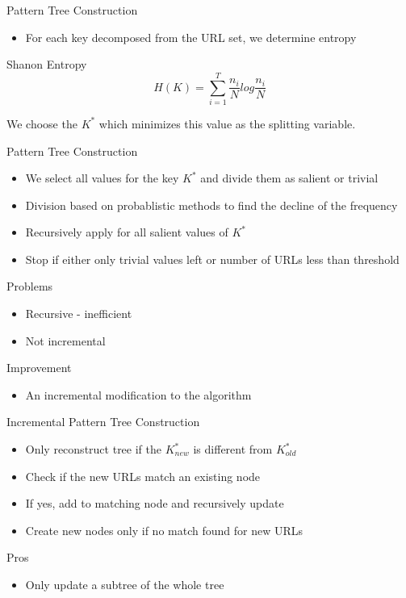 \documentclass[presentation]{beamer}
\begin{document}
\begin{frame}[label={sec:orgheadline14}]{Pattern Tree Construction}
\begin{itemize}
\item For each key decomposed from the URL set, we determine entropy
\end{itemize}

\alert{Shanon Entropy}
\begin{equation}
H(K) = \sum_{i=1}^{T} \frac{n_i}{N} log \frac{n_i}{N}
\end{equation}

We choose the \(K^*\) which minimizes this value as the splitting variable.
\end{frame}

\begin{frame}[label={sec:orgheadline15}]{Pattern Tree Construction}
\begin{itemize}
\item We select all values for the key \(K^*\) and divide them as \alert{salient} or \alert{trivial}
\item Division based on probablistic methods to find the \alert{decline} of the frequency
\item Recursively apply for all \alert{salient} values of \(K^*\)
\item Stop if either only \alert{trivial} values left or number of URLs less than threshold
\end{itemize}
\end{frame}

\begin{frame}[label={sec:orgheadline16}]{Problems}
\begin{itemize}
\item Recursive - inefficient
\item Not incremental
\end{itemize}

\alert{Improvement}
\begin{itemize}
\item An incremental modification to the algorithm
\end{itemize}
\end{frame}

\begin{frame}[label={sec:orgheadline17}]{Incremental Pattern Tree Construction}
\begin{itemize}
\item Only reconstruct tree if the \(K^*_{new}\) is different from \(K^*_{old}\)
\item Check if the new URLs match an existing node
\item If yes, add to matching node and recursively update
\item Create new nodes only if no match found for new URLs
\end{itemize}

\alert{Pros}
\begin{itemize}
\item Only update a subtree of the whole tree
\end{itemize}
\end{frame}
\end{document}
